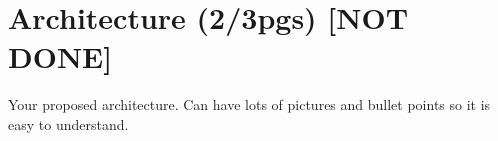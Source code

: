 
% 
% 

\section{Architecture (2/3pgs)  [NOT DONE]}
\label{sec:architecture}

Your proposed architecture. Can have lots of pictures and bullet points so it is easy to understand.
